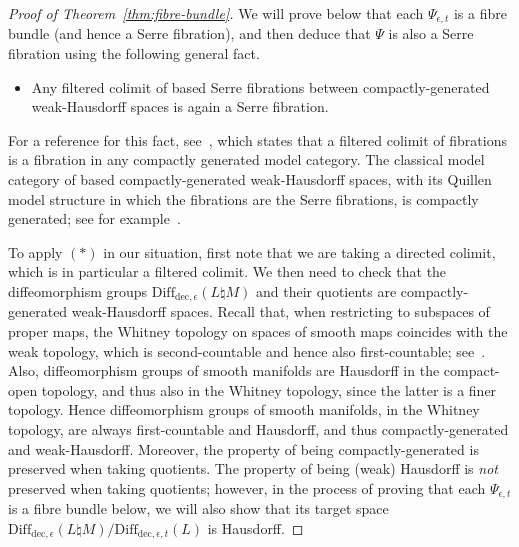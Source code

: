 \documentclass[AHL,Unicode,published]{cedram}
\newcommand{\rdec}{\mathrm{dec}}
\newcommand{\diffdece}{\ensuremath{\mathrm{Diff}_{\rdec,\epsilon}}}
\newcommand{\diffdecet}{\ensuremath{\mathrm{Diff}_{\rdec,\epsilon,t}}}
\newcommand*{\MK}{\mkern 2mu}
\begin{document}
\begin{proof}[Proof of Theorem~\ref{thm:fibre-bundle}]
We will prove below that each $\Psi_{\epsilon,t}$ is a fibre bundle (and hence a Serre fibration), and then deduce that $\Psi$ is also a Serre fibration using the following general fact.
\begin{itemize}
\item[$(*)$] Any filtered colimit of based Serre fibrations between compactly-generated weak-Hausdorff spaces is again a Serre fibration.
\end{itemize}
For a reference for this fact, see~\cite[Prop.~1.2.3.5$\MK$(1)]{ToenVezzosi}, which states that a filtered colimit of fibrations is a fibration in any compactly generated model category. The classical model category of based compactly-generated weak-Hausdorff spaces, with its Quillen model structure in which the fibrations are the Serre fibrations, is compactly generated; see for example~\cite[Prop.~6.3]{MMSS}.

To apply $(*)$ in our situation, first note that we are taking a directed colimit, which is in particular a filtered colimit. We then need to check that the diffeomorphism groups $\diffdece(L \natural M)$ and their quotients are compactly-generated weak-Hausdorff spaces. Recall that, when restricting to subspaces of proper maps, the Whitney topology on spaces of smooth maps coincides with the weak topology, which is second-countable and hence also first-countable; see~\cite[Chap.~2.1]{Hirsch1976Differentialtopology}. Also, diffeomorphism groups of smooth manifolds are Hausdorff in the compact-open topology, and thus also in the Whitney topology, since the latter is a finer topology. Hence diffeomorphism groups of smooth manifolds, in the Whitney topology, are always first-countable and Hausdorff, and thus compactly-generated and weak-Hausdorff. Moreover, the property of being compactly-generated is preserved when taking quotients. The property of being (weak) Hausdorff is \emph{not} preserved when taking quotients; however, in the process of proving that each $\Psi_{\epsilon,t}$ is a fibre bundle below, we will also show that its target space $\diffdece(L\natural M) / \diffdecet(L)$ is Hausdorff.


\end{proof}
\end{document}
